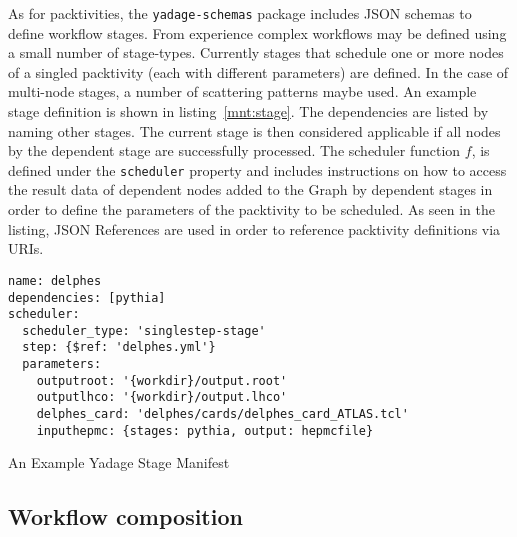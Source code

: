 \documentclass[a4paper]{jpconf}
\begin{document}
As for packtivities, the \verb+yadage-schemas+ package includes JSON schemas to define workflow stages. From experience complex workflows may be defined using a small number of stage-types. Currently stages that schedule one or more nodes of a singled packtivity (each with different parameters) are defined. In the case of multi-node stages, a number of scattering patterns maybe used. An example stage definition is shown in listing~\ref{mnt:stage}. The dependencies are listed by naming other stages. The current stage is then considered applicable if all nodes by the dependent stage are successfully processed. The scheduler function $f$, is defined under the \verb+scheduler+ property and includes instructions on how to access the result data of dependent nodes added to the Graph by dependent stages in order to define the parameters of the packtivity to be scheduled. As seen in the listing, JSON References are used in order to reference packtivity definitions via URIs.

\begin{listing}[!ht]
\begin{verbatim}
name: delphes
dependencies: [pythia]
scheduler:
  scheduler_type: 'singlestep-stage'
  step: {$ref: 'delphes.yml'}
  parameters:
    outputroot: '{workdir}/output.root'
    outputlhco: '{workdir}/output.lhco'
    delphes_card: 'delphes/cards/delphes_card_ATLAS.tcl'
    inputhepmc: {stages: pythia, output: hepmcfile}
\end{verbatim}
\caption{An Example Yadage Stage Manifest}
\label{mnt:stage}
\end{listing}

\subsection{Workflow composition}
\end{document}
